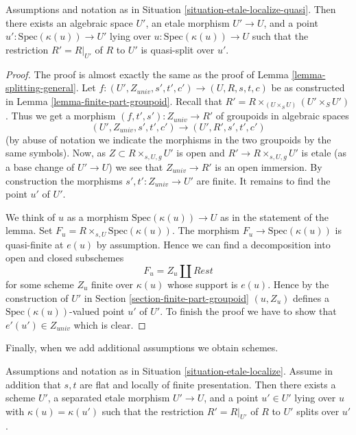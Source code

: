 \begin{lemma}
\label{lemma-quasi-splitting-general}
Assumptions and notation as in
Situation \ref{situation-etale-localize-quasi}.
Then there exists an algebraic space $U'$, an etale morphism
$U' \to U$, and a point $u' : \text{Spec}(\kappa(u)) \to U'$
lying over $u : \text{Spec}(\kappa(u)) \to U$
such that the restriction $R' = R|_{U'}$ of $R$ to $U'$
is quasi-split over $u'$.
\end{lemma}

\begin{proof}
The proof is almost exactly the same as the proof of
Lemma \ref{lemma-splitting-general}.
Let $f : (U', Z_{univ}, s', t', c') \to (U, R, s, t, c)$ be as constructed in
Lemma \ref{lemma-finite-part-groupoid}.
Recall that $R' = R \times_{(U \times_S U)} (U' \times_S U')$.
Thus we get a morphism $(f, t', s') : Z_{univ} \to R'$ of groupoids
in algebraic spaces
$$
(U', Z_{univ}, s', t', c') \to (U', R', s', t', c')
$$
(by abuse of notation we indicate the morphisms in the two groupoids
by the same symbols). Now, as $Z \subset R \times_{s, U, g} U'$ is open
and $R' \to R \times_{s, U, g} U'$ is etale (as a base change
of $U' \to U$) we see that $Z_{univ} \to R'$ is an open immersion.
By construction the morphisms $s', t' : Z_{univ} \to U'$ are finite.
It remains to find the point $u'$ of $U'$.

\medskip\noindent
We think of $u$ as a morphism $\text{Spec}(\kappa(u)) \to U$ as in
the statement of the lemma. Set $F_u = R \times_{s, U} \text{Spec}(\kappa(u))$.
The morphism $F_u \to \text{Spec}(\kappa(u))$ is quasi-finite at $e(u)$
by assumption. Hence we can find a decomposition into open and closed
subschemes
$$
F_u = Z_u \coprod Rest
$$
for some scheme $Z_u$ finite over $\kappa(u)$ whose support is $e(u)$.
Hence by the construction of $U'$ in
Section \ref{section-finite-part-groupoid}
$(u, Z_u)$ defines a $\text{Spec}(\kappa(u))$-valued
point $u'$ of $U'$. To finish the proof we have to show that
$e'(u') \in Z_{univ}$ which is clear.
\end{proof}

\noindent
Finally, when we add additional assumptions we obtain schemes.

\begin{lemma}
\label{lemma-splitting-scheme}
Assumptions and notation as in
Situation \ref{situation-etale-localize}.
Assume in addition that $s, t$ are flat and locally of finite presentation.
Then there exists a scheme $U'$, a separated etale morphism
$U' \to U$, and a point $u' \in U'$
lying over $u$ with $\kappa(u) = \kappa(u')$
such that the restriction $R' = R|_{U'}$ of $R$ to $U'$
splits over $u'$.
\end{lemma}

